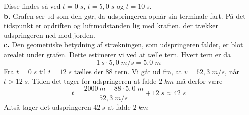 \documentclass{report}
\begin{document}
Disse findes så ved $t=0\;\unit{s}$, $t=5,0 \;\unit{s} $ og $t=10\;\unit{s}$. \\[1ex]
\textbf{b.} Grafen ser ud som den gør, da udspringeren opnår sin terminale fart. På det tidspunkt er opdriften og luftmodstanden lig med kraften, der trækker udspringeren ned mod jorden. \\[1ex]
\textbf{c.} Den geometriske betydning af strækningen, som udspringeren falder, er blot arealet under grafen. Dette estimerer vi ved at tælle tern. Hvert tern er da
\[
1 \;\unit{s} \cdot 5,0 \;\unit{m/s} =5,0 \;\unit{m} 
\] 
Fra $t=0 \;\unit{s} $ til $t=12 \;\unit{s} $ tælles der 88 tern. Vi går ud fra, at $v=52,3 \;\unit{m/s} $, når $t>12 \;\unit{s} $. 
Tiden det tager for udspringeren at falde $2 \;\unit{km} $ må derfor være
\[
t=\frac{2000 \;\unit{m} -88\cdot 5,0 \;\unit{m} }{52,3 \;\unit{m/s} }+12 \;\unit{s} \approx 42 \;\unit{s} 
\] 
Altså tager det udspringeren $42 \;\unit{s} $ at falde $2 \;\unit{km} $.
\end{document}
